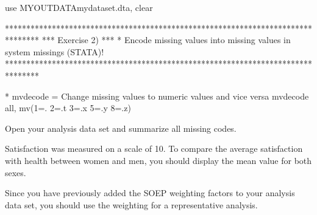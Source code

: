 \documentclass[letterpaper,10pt,openany,onesideH,english]{sphinxmanual}
\begin{document}
%
\begin{sphinxVerbatim}[commandchars=\\\{\},numbers=left,firstnumber=1,stepnumber=1]
use \PYGZdq{}\PYGZdl{}MY\PYGZus{}OUT\PYGZus{}DATA\PYGZbs{}my\PYGZus{}dataset.dta\PYGZdq{}, clear


********************************************************************************
*** Exercise 2) ***
* Encode missing values into missing values in system missings (STATA)!
********************************************************************************

* mvdecode = Change missing values to numeric values and vice versa
	mvdecode \PYGZus{}all, mv(\PYGZhy{}1=. \PYGZbs{} \PYGZhy{}2=.t \PYGZbs{} \PYGZhy{}3=.x \PYGZbs{} \PYGZhy{}5=.y \PYGZbs{} \PYGZhy{}8=.z)
\end{sphinxVerbatim}

Open your analysis data set and summarize all missing codes.


Satisfaction was measured on a scale of 10. To compare the average satisfaction with health between women and men, you should display the mean value for both sexes.

%
\begin{sphinxVerbatim}[commandchars=\\\{\},numbers=left,firstnumber=1,stepnumber=1]
	  
\end{sphinxVerbatim}

\begin{figure}[H]
\centering

\noindent{}
\end{figure}

Since you have previously added the SOEP weighting factors to your analysis data set, you should use the weighting for a representative analysis.

%
\begin{sphinxVerbatim}[commandchars=\\\{\},numbers=left,firstnumber=1,stepnumber=1]
	  \PYG{p}{[}\PYG{p}{]} 		
\end{sphinxVerbatim}
\end{document}
